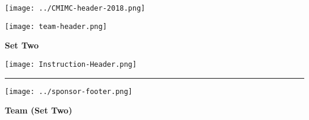 \documentclass[10pt]{article}
\begin{document}
\thispagestyle{empty}
\begin{center}

\vspace*{40pt}

\texttt{[image: ../CMIMC-header-2018.png]}

\texttt{[image: team-header.png]}

\vspace{0.2in}

\Huge \textbf{Set Two}\normalsize

\vspace{1in}

\texttt{[image: Instruction-Header.png]}
\noindent\rule{15.7cm}{2pt}
\end{center}

\vspace{10pt}



\vspace{0.7in}

\begin{center}
\texttt{[image: ../sponsor-footer.png]}
\end{center}
\newpage

\begin{center}
\huge\textbf{Team (Set Two)}\normalsize

\vspace{3pt}
\end{center}
\end{document}

